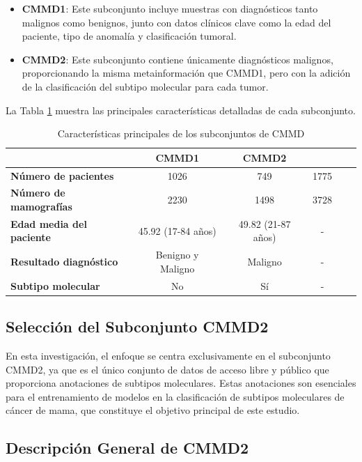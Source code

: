 \documentclass[a4paper,10pt]{book}
\begin{document}
\begin{itemize}
\item \textbf{CMMD1}: Este subconjunto incluye muestras con diagnósticos tanto malignos como benignos, junto con datos clínicos clave como la edad del paciente, tipo de anomalía y clasificación tumoral.
\item \textbf{CMMD2}: Este subconjunto contiene únicamente diagnósticos malignos, proporcionando la misma metainformación que CMMD1, pero con la adición de la clasificación del subtipo molecular para cada tumor.
\end{itemize}

La Tabla \ref{tab:cmmd_features} muestra las principales características detalladas de cada subconjunto.

\begin{table}
\caption[Características principales de los subconjuntos de CMMD]{Características principales de los subconjuntos de CMMD}
\centering
\begin{tabular}{lccccc}
\toprule
& \textbf{CMMD1} & \textbf{CMMD2} & \\
\midrule
\textbf{Número de pacientes} & 1026 & 749 & 1775 \\
\textbf{Número de mamografías} & 2230 & 1498 & 3728 \\
\textbf{Edad media del paciente} & 45.92 (17-84 años) & 49.82 (21-87 años) & - \\
\textbf{Resultado diagnóstico} & Benigno y Maligno & Maligno & - \\
\textbf{Subtipo molecular} & No & Sí & - \\
\bottomrule
\end{tabular}
\label{tab:cmmd_features}
\end{table}

\subsection{Selección del Subconjunto CMMD2}

En esta investigación, el enfoque se centra exclusivamente en el subconjunto CMMD2, ya que es el único conjunto de datos de acceso libre y público que proporciona anotaciones de subtipos moleculares. Estas anotaciones son esenciales para el entrenamiento de modelos en la clasificación de subtipos moleculares de cáncer de mama, que constituye el objetivo principal de este estudio.

\subsection{Descripción General de CMMD2}
\end{document}
